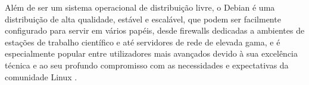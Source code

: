 Além de ser um sistema operacional de distribuição livre, o Debian é uma distribuição de alta qualidade, estável e escalável, que podem ser facilmente configurado para servir em vários papéis, desde firewalls dedicadas a ambientes de estações de trabalho científico e até servidores de rede de elevada gama, e é especialmente popular entre utilizadores mais avançados devido à sua excelência técnica e ao seu profundo compromisso com as necessidades e expectativas da comunidade Linux \cite{valessiosoaresbrito2015}.


